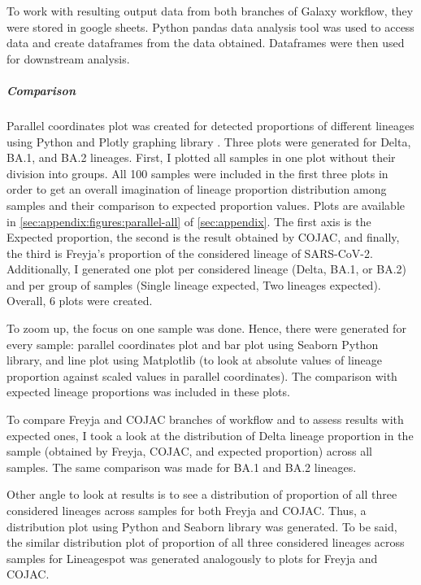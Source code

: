                 To work with resulting output data from both branches of Galaxy workflow, they were stored in google sheets. Python pandas data analysis tool \cite{pandas2022} was used to access data and create dataframes from the data obtained. Dataframes were then used for downstream analysis.

                \subparagraph{Comparison}
                Parallel coordinates plot was created for detected proportions of different lineages using Python and Plotly graphing library \cite{plotly}. Three plots were generated for Delta, BA.1, and BA.2 lineages. First, I plotted all samples in one plot without their division into groups. All 100 samples were included in the first three plots in order to get an overall imagination of lineage proportion distribution among samples and their comparison to expected proportion values. Plots are available in \autoref{sec:appendix:figures:parallel-all} of \cref{sec:appendix}. The first axis is the Expected proportion, the second is the result obtained by COJAC, and finally, the third is Freyja’s proportion of the considered lineage of SARS-CoV-2. Additionally, I generated one plot per considered lineage (Delta, BA.1, or BA.2) and per group of samples (Single lineage expected, Two lineages expected). Overall, 6 plots were created. 

                To zoom up, the focus on one sample was done. Hence, there were generated for every sample: parallel coordinates plot and bar plot using Seaborn Python library, and line plot using Matplotlib (to look at absolute values of lineage proportion against scaled values in parallel coordinates). The comparison with expected lineage proportions was included in these plots.
                
                To compare Freyja and COJAC branches of workflow and to assess results with expected ones, I took a look at the distribution of Delta lineage proportion in the sample (obtained by Freyja, COJAC, and expected proportion) across all samples. The same comparison was made for BA.1 and BA.2 lineages.
                
                Other angle to look at results is to see a distribution of proportion of all three considered lineages across samples for both Freyja and COJAC. Thus, a distribution plot using Python and Seaborn library was generated. To be said, the similar distribution plot of proportion of all three considered lineages across samples for Lineagespot was generated analogously to plots for Freyja and COJAC.

